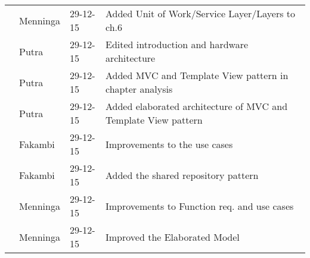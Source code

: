 \begin{longtable}{L{} L{} L{} L{}}
					& Menninga  & 29-12-15 & Added Unit of Work/Service Layer/Layers to ch.6 \\
					& Putra		& 29-12-15 & Edited introduction and hardware architecture \\
					& Putra		& 29-12-15 & Added MVC and Template View pattern in chapter analysis\\
					& Putra		& 29-12-15 & Added elaborated architecture of MVC and Template View pattern\\
					& Fakambi   & 29-12-15 & Improvements to the use cases \\
					& Fakambi   & 29-12-15 & Added the shared repository pattern \\
					& Menninga  & 29-12-15 & Improvements to Function req. and use cases\\
					& Menninga  & 29-12-15 & Improved the Elaborated Model \\
	\bottomrule
\end{longtable}